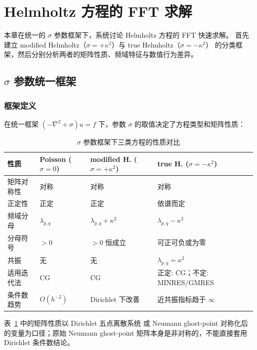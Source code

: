 \section{Helmholtz 方程的 FFT 求解}
\label{sec:helmholtz}

本章在统一的 $\sigma$ 参数框架下，系统讨论 Helmholtz 方程的 FFT 快速求解。
首先建立 modified Helmholtz（$\sigma=+\kappa^2$）与 true Helmholtz（$\sigma=-\kappa^2$）
的分类框架，然后分别分析两者的矩阵性质、频域特征与数值行为差异。

\subsection{$\sigma$ 参数统一框架}

\subsubsection{框架定义}

在统一框架 $(-\nabla^2+\sigma)u=f$ 下，参数 $\sigma$ 的取值决定了方程类型和矩阵性质：

\begin{table}[H]
\centering
\caption{$\sigma$ 参数框架下三类方程的性质对比}
\label{tab:sigma_framework}
\small
\begin{tabularx}{\textwidth}{l>{\centering\arraybackslash}X>{\centering\arraybackslash}X>{\centering\arraybackslash}X}
\toprule
性质 & Poisson ($\sigma=0$) & modified H. ($\sigma=+\kappa^2$) & true H. ($\sigma=-\kappa^2$) \\
\midrule
矩阵对称性 & 对称 & 对称 & 对称 \\
正定性 & 正定 & 正定 & 依谱而定 \\
频域分母 & $\lambda_{p,q}$ & $\lambda_{p,q}+\kappa^2$ & $\lambda_{p,q}-\kappa^2$ \\
分母符号 & $>0$ & $>0$ 恒成立 & 可正可负或为零 \\
共振 & 无 & 无 & $\lambda_{p,q}=\kappa^2$ \\
适用迭代法 & CG & CG & 正定: CG；不定: MINRES/GMRES \\
条件数趋势 & $O(h^{-2})$ & Dirichlet 下改善 & 近共振指标趋于 $\infty$ \\
\bottomrule
\end{tabularx}
\end{table}
表~\ref{tab:sigma_framework} 中的矩阵性质以 Dirichlet 五点离散系统
或 Neumann ghost-point 对称化后的变量为口径；原始 Neumann ghost-point
矩阵本身是非对称的，不能直接套用 Dirichlet 条件数结论。

